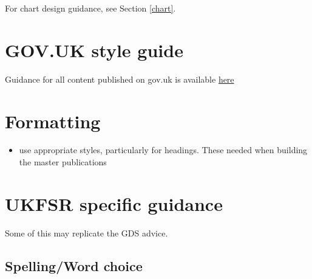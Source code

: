 \documentclass[
]{book}
\providecommand{\tightlist}{%
  \setlength{\itemsep}{0pt}\setlength{\parskip}{0pt}}
\begin{document}
For chart design guidance, see Section \ref{chart}.

\hypertarget{gov.uk-style-guide}{%
\section{GOV.UK style guide}\label{gov.uk-style-guide}}

Guidance for all content published on gov.uk is available \href{https://www.gov.uk/guidance/style-guide}{here}

\hypertarget{formatting}{%
\section{Formatting}\label{formatting}}

\begin{itemize}
\tightlist
\item
  use appropriate styles, particularly for headings. These needed when building the master publications
\end{itemize}

\hypertarget{ukfsr-specific-guidance}{%
\section{UKFSR specific guidance}\label{ukfsr-specific-guidance}}

Some of this may replicate the GDS advice.

\hypertarget{spellingword-choice}{%
\subsection{Spelling/Word choice}\label{spellingword-choice}}
\end{document}

